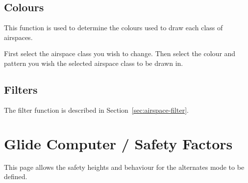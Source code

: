 \subsection*{Colours}
This function is used to determine the colours used to draw each class of
airspaces.

First select the airspace class you wish to change. Then select the colour and 
pattern you wish the selected airspace class to be drawn in.

\subsection*{Filters}
The filter function is described in Section~\ref{sec:airspace-filter}.


\section{Glide Computer / Safety Factors}

This page allows the safety heights and behaviour for the alternates mode to be defined.

